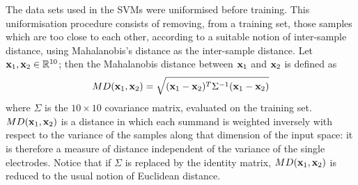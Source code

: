 %
%
%
%

The data sets used in the SVMs were uniformised before training.
This uniformisation procedure consists of removing, from a
training set, those samples which are too close to each other,
according to a suitable notion of inter-sample distance, using
Mahalanobis's distance as the inter-sample distance. Let $\mathbf{x}_1,
\mathbf{x}_2 \in \mathbb{R}^{10}$; then the Mahalanobis distance between $\mathbf{x}_1$
and $\mathbf{x}_2$ is defined as
$$ MD(\mathbf{x}_1,\mathbf{x}_2) = \sqrt{(\mathbf{x}_1-\mathbf{x}_2)^T \Sigma^{-1} (\mathbf{x}_1-\mathbf{x}_2)} $$
where $\Sigma$ is the $10\times10$ covariance matrix, evaluated on
the training set. $MD(\mathbf{x}_1,\mathbf{x}_2)$ is a distance in which each
summand is weighted inversely with respect to the variance of the
samples along that dimension of the input space: it is therefore a
measure of distance independent of the variance of the single
electrodes. Notice that if $\Sigma$ is replaced by the identity
matrix, $MD(\mathbf{x}_1,\mathbf{x}_2)$ is reduced to the usual notion of
Euclidean distance.

